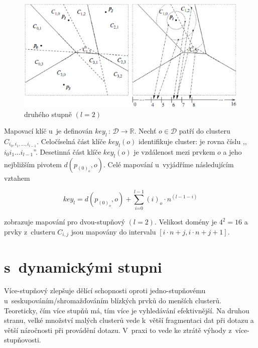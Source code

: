 \begin{figure}[t]
\centering{}\includegraphics[scale=0.5]{m-index-level-two}\caption{\MIndex druhého stupně $(l=2)$\label{fig:M-Index-level-two}}
\end{figure}


Mapovací klíč \MIndex u~je definován $key_{l}\,:\,\mathcal{D\rightarrow\mathbb{R}}$\@.
Nechť $o\in\mathcal{D}$ patří do clusteru $C_{i_{0},i_{1},\ldots,i_{l-1}}$\@.
Celočíselná část klíče $key_{l}(o)$ identifikuje cluster: je rovna
číslu ,,$i_{0}i_{1}\ldots i_{l-1}$''\@. Desetinná část klíče $key_{l}(o)$
je vzdálenost mezi prvkem $o$ a jeho nejbližším pivotem $d(p_{(0)_{o}},o)$\@.
Celé mapování \MIndex u~vyjádříme následujícím vztahem

\begin{equation}
key_{l}=d(p_{(0)_{o}},o)+\sum_{i\text{=0}}^{l-1}(i)_{o}\cdot n{}^{(l-1-i)}\label{eq:M-Index-key}
\end{equation}


zobrazuje mapování pro dvou-stupňový
\MIndex $(l=2)$\@. Velikost domény je $4^{2}=16$ a prvky z~clusteru
$C_{i,j}$ jsou mapovány do intervalu $[i\cdot n+j,i\cdot n+j+1]$\@.


\section{\MIndex s~dynamickými stupni\label{sec:Dynamic-Cluster-Tree}}

Více-stupňový \MIndex zlepšuje dělící schopnosti oproti jedno-stupňovému
\MIndex u~seskupováním/shromažďováním blízkých prvků do menších clusterů\@.
Teoreticky, čím více stupňů \MIndex má, tím více je vyhledávání efektivnější\@.
Na druhou stranu, velké množství malých clusterů vede k~větší fragmentaci
dat při dotazu a větší náročnosti při provádění dotazu\@. V~praxi
to vede ke ztrátě výhody z~více-stupňovosti\@.

